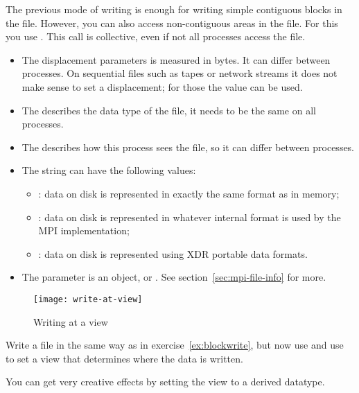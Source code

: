 The previous mode of writing is enough for writing simple contiguous blocks in the file.
However,
you can also access non-contiguous areas in the file. For this you use
%
.
%
This call is collective, even if not all processes access the file.
\begin{itemize}
\item The  displacement parameters is measured in bytes. It
  can differ between processes. On sequential files such as tapes or
  network streams it does not make sense to set a displacement; for
  those the  value can be
  used.
\item The  describes the data type of the file, it needs to
  be the same on all processes.
\item The  describes how this process sees the file, so it
  can differ between processes.
\item The  string can have the following values:
  \begin{itemize}
  \item {}: data on disk is represented in exactly the same
    format as in memory;
  \item {}: data on disk is represented in whatever internal
    format is used by the MPI implementation;
  \item {}: data on disk is represented using XDR portable
    data formats.
  \end{itemize}
\item The  parameter is an  object,
  or . See section~\ref{sec:mpi-file-info} for more.
\end{itemize}

\begin{figure}[ht]
  \label{fig:write-view}
  \caption{Writing at a view}
  \texttt{[image: write-at-view]}
\end{figure}

\begin{exercise}
  \label{ex:viewwrite}
  Write a file in the same way as in exercise~\ref{ex:blockwrite},
  but now use  and use  to set
  a view that determines where the data is written.
\end{exercise}

You can get very creative effects by setting the view to a derived
datatype.

